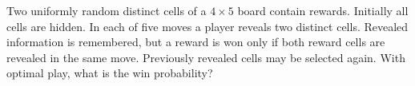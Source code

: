 Two uniformly random distinct cells of a $4\times5$ board contain rewards. Initially all cells are hidden. In each of five moves a player reveals two distinct cells. Revealed information is remembered, but a reward is won only if both reward cells are revealed in the same move. Previously revealed cells may be selected again. With optimal play, what is the win probability?
